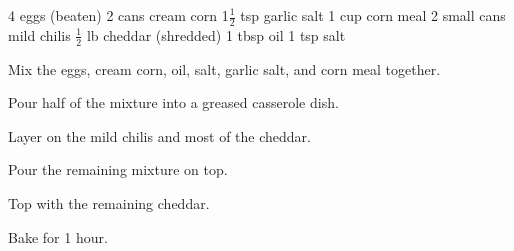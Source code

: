 \dishtype{\vegetarian}
\begin{ingreds}
    4 eggs (beaten)
    2 cans cream corn
    1$\frac{1}{2}$ tsp garlic salt
    1 cup corn meal
    2 small cans mild chilis
    $\frac{1}{2}$ lb cheddar (shredded)
    1 tbsp oil
    1 tsp salt
\end{ingreds}
\begin{method}
    Mix the eggs, cream corn, oil, salt, garlic salt, and corn meal together.\par
    Pour half of the mixture into a greased casserole dish.\par
    Layer on the mild chilis and most of the cheddar.\par
    Pour the remaining mixture on top.\par
    Top with the remaining cheddar.\par
    Bake for 1 hour.
\end{method}